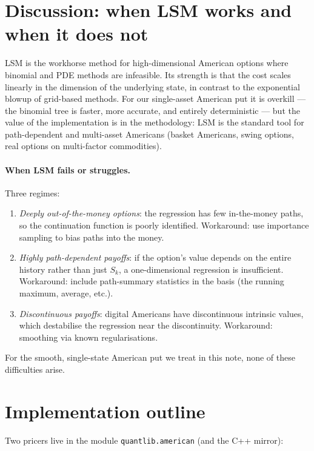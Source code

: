 \documentclass[11pt,a4paper]{article}
\theoremstyle{plain}
\theoremstyle{definition}
\theoremstyle{remark}
\begin{document}
\section{Discussion: when LSM works and when it does not}
\label{sec:discussion}

LSM is the workhorse method for high-dimensional American options
where binomial and PDE methods are infeasible. Its strength is that
the cost scales linearly in the dimension of the underlying state, in
contrast to the exponential blowup of grid-based methods. For our
single-asset American put it is overkill --- the binomial tree is
faster, more accurate, and entirely deterministic --- but the value
of the implementation is in the methodology: LSM is the standard tool
for path-dependent and multi-asset Americans (basket Americans,
swing options, real options on multi-factor commodities).

\paragraph{When LSM fails or struggles.} Three regimes:

\begin{enumerate}
\item \emph{Deeply out-of-the-money options}: the regression has
      few in-the-money paths, so the continuation function is
      poorly identified. Workaround: use importance sampling to
      bias paths into the money.
\item \emph{Highly path-dependent payoffs}: if the option's value
      depends on the entire history rather than just $S_k$, a
      one-dimensional regression is insufficient. Workaround:
      include path-summary statistics in the basis (the running
      maximum, average, etc.).
\item \emph{Discontinuous payoffs}: digital Americans have
      discontinuous intrinsic values, which destabilise the
      regression near the discontinuity. Workaround: smoothing
      via known regularisations.
\end{enumerate}

For the smooth, single-state American put we treat in this note,
none of these difficulties arise.

\section{Implementation outline}
\label{sec:impl}

Two pricers live in the module \texttt{quantlib.american}
(and the C++ mirror):
\end{document}
